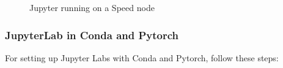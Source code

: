 \begin{figure}[htbp]
	\centering
	\caption{Jupyter running on a Speed node}
	\label{fig:jupyter}
\end{figure}

\subsubsection{JupyterLab in Conda and Pytorch}
\label{sect:jupiterlabs}

For setting up Jupyter Labs with Conda and Pytorch, follow these steps:

